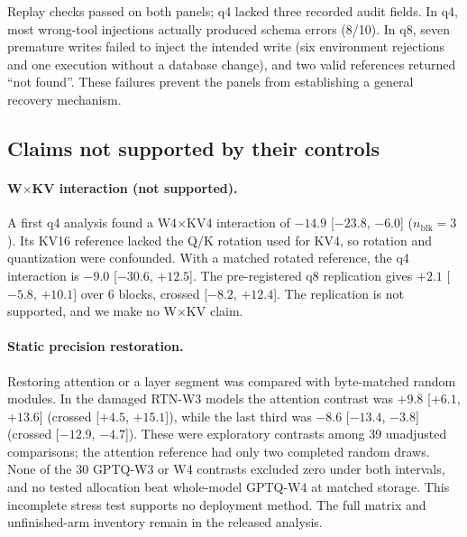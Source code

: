 Replay checks passed on both panels; q4 lacked three recorded audit fields. In q4, most wrong-tool injections actually produced schema errors (8/10). In q8, seven premature writes failed to inject the intended write (six environment rejections and one execution without a database change), and two valid references returned ``not found''. These failures prevent the panels from establishing a general recovery mechanism. %


\subsection{Claims not supported by their controls}
\label{app:withdrawn}
\paragraph{W$\times$KV interaction (not supported).} A first q4 analysis found a W4$\times$KV4 interaction of $-14.9$ [$-23.8$, $-6.0$]\pp{} ($n_{\mathrm{blk}}=3$). Its KV16 reference lacked the Q/K rotation used for KV4, so rotation and quantization were confounded. %
With a matched rotated reference, the q4 interaction is $-9.0$ [$-30.6$, $+12.5$]. %
The pre-registered q8 replication gives $+2.1$ [$-5.8$, $+10.1$] over 6 blocks, crossed [$-8.2$, $+12.4$]. The replication is not supported, and we make no W$\times$KV claim. %

\paragraph{Static precision restoration.} Restoring attention or a layer segment was compared with byte-matched random modules. In the damaged RTN-W3 models the attention contrast was $+9.8$ [$+6.1$, $+13.6$]\pp{} (crossed [$+4.5$, $+15.1$]), while the last third was $-8.6$ [$-13.4$, $-3.8$] (crossed [$-12.9$, $-4.7$]). These were exploratory contrasts among 39 unadjusted comparisons; the attention reference had only two completed random draws. None of the 30 GPTQ-W3 or W4 contrasts excluded zero under both intervals, and no tested allocation beat whole-model GPTQ-W4 at matched storage. This incomplete stress test supports no deployment method. The full matrix and unfinished-arm inventory remain in the released analysis. %

